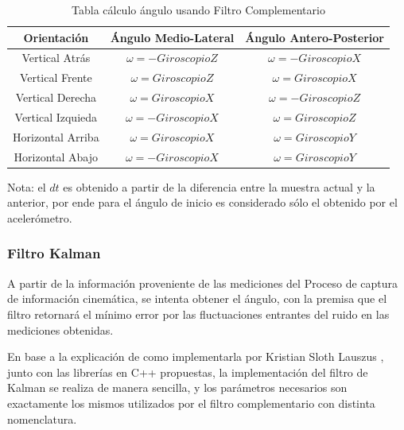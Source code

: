 \documentclass[12pt,a4paper]{article}
\begin{document}
\begin{table}[H]
	\centering
	\begin{tabular}{|c|c|c|}
		\hline 
		\textbf{Orientación} & \textbf{Ángulo Medio-Lateral} & \textbf{Ángulo Antero-Posterior} \\ 
		\hline 
		Vertical Atrás & $\omega= -GiroscopioZ$ &  $\omega= -GiroscopioX$ \\ 
		\hline 
		Vertical Frente & $\omega= GiroscopioZ$ &  $\omega= GiroscopioX$ \\
		\hline 
		Vertical Derecha & $\omega= GiroscopioX$ &  $\omega= -GiroscopioZ$ \\ 
		\hline 
		Vertical Izquieda & $\omega= -GiroscopioX$ &  $\omega= GiroscopioZ$ \\ 
		\hline 
		Horizontal Arriba & $\omega= GiroscopioX$ &  $\omega= GiroscopioY$ \\ 
		\hline 
		Horizontal Abajo & $\omega= -GiroscopioX$ &  $\omega= GiroscopioY$ \\ 
		\hline 
	\end{tabular}
	\caption{Tabla cálculo ángulo usando Filtro Complementario} 
	\label{table:calculoAnguloFiltroComplementario}
\end{table}

Nota: el $dt$ es obtenido a partir de la diferencia entre la muestra actual y la anterior, por ende para el ángulo de inicio es considerado sólo el obtenido por el acelerómetro.

\subsubsection{Filtro Kalman}
A partir de la información proveniente de las mediciones del Proceso de captura de información cinemática, se intenta obtener el ángulo, con la premisa que el filtro retornará el mínimo error por las fluctuaciones entrantes del ruido en las mediciones obtenidas.

En base a la explicación de como implementarla por Kristian Sloth Lauszus
\cite{kalmanTKJ}, junto con las librerías en C++ propuestas, la implementación del filtro de Kalman se realiza de manera sencilla, y los parámetros necesarios son exactamente los mismos utilizados por el filtro complementario con distinta nomenclatura.
\end{document}
